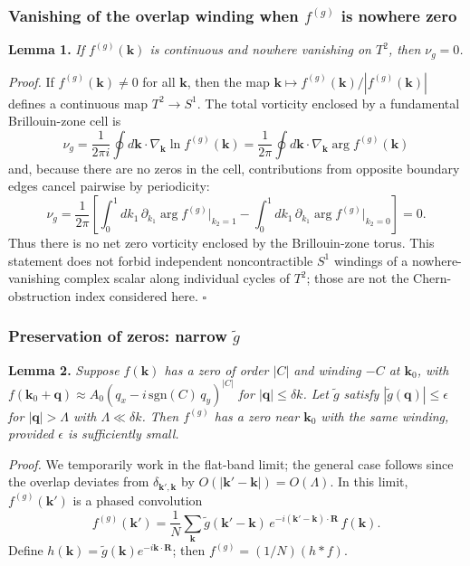 \documentclass[aps,prb,onecolumn,nofootinbib,superscriptaddress]{revtex4-2}
\newcommand{\mbf}[1]{\mathbf{#1}}
\begin{document}
\subsubsection{Vanishing of the overlap winding when $f^{(g)}$ is nowhere zero}

\noindent\textbf{Lemma 1.} \emph{If $f^{(g)}(\mbf{k})$ is continuous and nowhere vanishing on $T^2$, then $\nu_g = 0$.}

\medskip
\noindent\emph{Proof.} If $f^{(g)}(\mbf{k}) \neq 0$ for all $\mbf{k}$, then the map $\mbf{k} \mapsto f^{(g)}(\mbf{k})/|f^{(g)}(\mbf{k})|$ defines a continuous map $T^2 \to S^1$. The total vorticity enclosed by a fundamental Brillouin-zone cell is
\begin{equation}
\nu_g = \frac{1}{2\pi i}\oint d\mbf{k}\cdot\nabla_{\mbf{k}}\ln f^{(g)}(\mbf{k}) = \frac{1}{2\pi}\oint d\mbf{k}\cdot\nabla_{\mbf{k}}\arg f^{(g)}(\mbf{k})
\end{equation}
and, because there are no zeros in the cell, contributions from opposite boundary edges cancel pairwise by periodicity:
\begin{equation}
\nu_g = \frac{1}{2\pi}\left[\int_0^1 dk_1\,\partial_{k_1}\arg f^{(g)}\big|_{k_2=1} - \int_0^1 dk_1\,\partial_{k_1}\arg f^{(g)}\big|_{k_2=0}\right] = 0.
\end{equation}
Thus there is no net zero vorticity enclosed by the Brillouin-zone torus.  This statement does not forbid independent noncontractible $S^1$ windings of a nowhere-vanishing complex scalar along individual cycles of $T^2$; those are not the Chern-obstruction index considered here. $\square$

\subsubsection{Preservation of zeros: narrow $\tilde{g}$}

\noindent\textbf{Lemma 2.} \emph{Suppose $f(\mbf{k})$ has a zero of order $|C|$ and winding $-C$ at $\mbf{k}_0$, with $f(\mbf{k}_0 + \mbf{q}) \approx A_0(q_x - i\,\mathrm{sgn}(C)\,q_y)^{|C|}$ for $|\mbf{q}| \leq \delta k$. Let $\tilde{g}$ satisfy $|\tilde{g}(\mbf{q})| \leq \epsilon$ for $|\mbf{q}| > \Lambda$ with $\Lambda \ll \delta k$. Then $f^{(g)}$ has a zero near $\mbf{k}_0$ with the same winding, provided $\epsilon$ is sufficiently small.}

\medskip
\noindent\emph{Proof.} We temporarily work in the flat-band limit; the general case follows since the overlap deviates from $\delta_{\mbf{k}',\mbf{k}}$ by $O(|\mbf{k}'-\mbf{k}|) = O(\Lambda)$. In this limit, $f^{(g)}(\mbf{k}')$ is a phased convolution
\begin{equation}\label{eq:fg_conv}
f^{(g)}(\mbf{k}') = \frac{1}{N}\sum_{\mbf{k}} \tilde{g}(\mbf{k}'-\mbf{k})\,e^{-i(\mbf{k}'-\mbf{k})\cdot\mbf{R}}\, f(\mbf{k}).
\end{equation}
Define $h(\mbf{k}) = \tilde{g}(\mbf{k})e^{-i\mbf{k}\cdot\mbf{R}}$; then $f^{(g)} = (1/N)(h * f)$.
\end{document}
